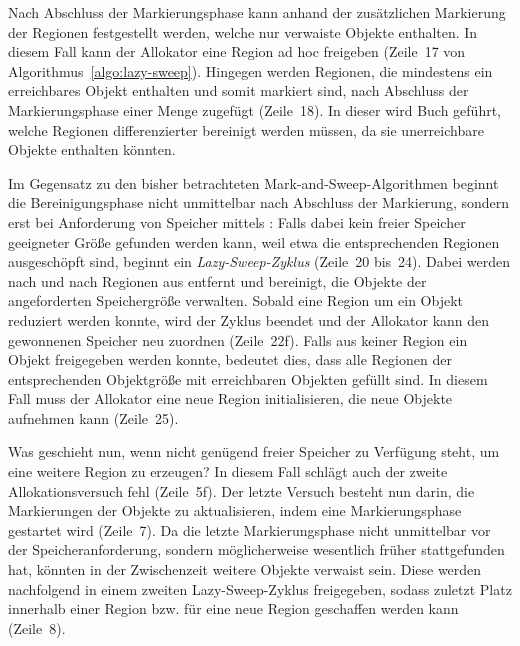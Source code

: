 Nach Abschluss der Markierungsphase kann anhand der zusätzlichen Markierung der Regionen festgestellt werden, welche nur verwaiste Objekte enthalten.
In diesem Fall kann der Allokator eine Region ad hoc freigeben (Zeile~17 von Algorithmus~\ref{algo:lazy-sweep}).
Hingegen werden Regionen, die mindestens ein erreichbares Objekt enthalten und somit markiert sind, nach Abschluss der Markierungsphase einer Menge  zugefügt (Zeile~18).
In dieser wird Buch geführt, welche Regionen differenzierter bereinigt werden müssen, da sie unerreichbare Objekte enthalten könnten.

Im Gegensatz zu den bisher betrachteten Mark-and-Sweep-Algorithmen beginnt die Bereinigungsphase nicht unmittelbar nach Abschluss der Markierung, sondern erst bei Anforderung von Speicher mittels :
Falls dabei kein freier Speicher geeigneter Größe gefunden werden kann, weil etwa die entsprechenden Regionen ausgeschöpft sind, beginnt ein \textit{Lazy-Sweep-Zyklus} (Zeile~20 bis~24).
Dabei werden nach und nach Regionen aus  entfernt und bereinigt, die Objekte der angeforderten Speichergröße verwalten.
Sobald eine Region um ein Objekt reduziert werden konnte, wird der Zyklus beendet und der Allokator kann den gewonnenen Speicher neu zuordnen (Zeile~22f).
Falls aus keiner Region ein Objekt freigegeben werden konnte, bedeutet dies, dass alle Regionen der entsprechenden Objektgröße mit erreichbaren Objekten gefüllt sind.
In diesem Fall muss der Allokator eine neue Region initialisieren, die neue Objekte aufnehmen kann (Zeile~25).

Was geschieht nun, wenn nicht genügend freier Speicher zu Verfügung steht, um eine weitere Region zu erzeugen?
In diesem Fall schlägt auch der zweite Allokationsversuch fehl (Zeile~5f).
Der letzte Versuch besteht nun darin, die Markierungen der Objekte zu aktualisieren, indem eine Markierungsphase gestartet wird (Zeile~7).
Da die letzte Markierungsphase nicht unmittelbar vor der Speicheranforderung, sondern möglicherweise wesentlich früher stattgefunden hat, könnten in der Zwischenzeit weitere Objekte verwaist sein.
Diese werden nachfolgend in einem zweiten Lazy-Sweep-Zyklus freigegeben, sodass zuletzt Platz innerhalb einer Region bzw. für eine neue Region geschaffen werden kann (Zeile~8).

